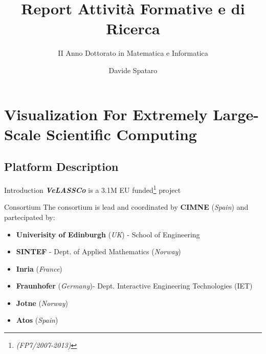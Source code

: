 \documentclass{beamer}
\title{Report Attività Formative e di Ricerca} %
\subtitle{II Anno Dottorato in Matematica e Informatica} %
\author{Davide Spataro}
\begin{document}
  \frame{\maketitle}


    \section{Visualization For Extremely Large-Scale
Scientific Computing}
    \subsection{Platform Description}
   
  \begin{frame}{Introduction}
\textbf{\textit{ VeLASSCo}} is  a 3.1M EU funded\footnote{\textit{(FP7/2007-2013)}} project

\begin{block}{Consortium}
	The consortium is lead and coordinated by \textbf{CIMNE} (\textit{Spain}) and partecipated by: 
	\begin{itemize}
		\item \textbf{Univerisity of Edinburgh} (\textit{UK}) - School of Engineering
		\item \textbf{SINTEF} - Dept. of Applied Mathematics (\textit{Norway})
		\item \textbf{Inria} (\textit{France})
		\item \textbf{Fraunhofer} (\textit{Germany})- Dept. Interactive Engineering Technologies (IET)
		\item \textbf{Jotne} (\textit{Norway})
		\item \textbf{Atos} (\textit{Spain})
	\end{itemize}
\end{block}


\end{frame} %
   
\end{document}
